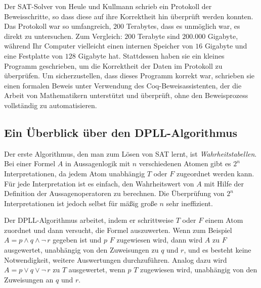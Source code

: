 Der SAT-Solver von Heule und Kullmann schrieb ein Protokoll der Beweisschritte, so dass diese auf ihre Korrektheit hin überprüft werden konnten. Das Protokoll war so umfangreich, $200$ Terabytes, dass es unmöglich war, es direkt zu untersuchen. Zum Vergleich: $200$ Terabyte sind $200.000$ Gigabyte, während Ihr Computer vielleicht einen internen Speicher von $16$ Gigabyte und eine Festplatte von $128$ Gigabyte hat. Stattdessen haben sie ein kleines Programm geschrieben, um die Korrektheit der Daten im Protokoll zu überprüfen. Um sicherzustellen, dass dieses Programm korrekt war, schrieben sie einen formalen Beweis unter Verwendung des Coq-Beweisassistenten, der die Arbeit von Mathematikern unterstützt und überprüft, ohne den Beweisprozess vollständig zu automatisieren.

\subsection{Ein Überblick über den DPLL-Algorithmus}

Der erste Algorithmus, den man zum Lösen von SAT lernt, ist \emph{Wahrheitstabellen}. Bei einer Formel $A$ in Aussagenlogik mit $n$ verschiedenen Atomen gibt es $2^n$ Interpretationen, da jedem Atom unabhängig $T$ oder $F$ zugeordnet werden kann. Für jede Interpretation ist es einfach, den Wahrheitswert von $A$ mit Hilfe der Definition der Aussagenoperatoren zu berechnen. Die Überprüfung von $2^n$ Interpretationen ist jedoch selbst für mäßig große $n$ sehr ineffizient.

Der DPLL-Algorithmus arbeitet, indem er schrittweise $T$ oder $F$ einem Atom zuordnet und dann versucht, die Formel auszuwerten. Wenn zum Beispiel $A=p \wedge q \wedge \neg\, r$ gegeben ist und $p$ $F$ zugewiesen wird, dann wird $A$ zu $F$ ausgewertet, unabhängig von den Zuweisungen zu $q$ und $r$, und es besteht keine Notwendigkeit, weitere Auswertungen durchzuführen. Analog dazu wird $A=p\vee q \vee \neg\, r$ zu $T$ ausgewertet, wenn $p$ $T$ zugewiesen wird, unabhängig von den Zuweisungen an $q$ und $r$.


